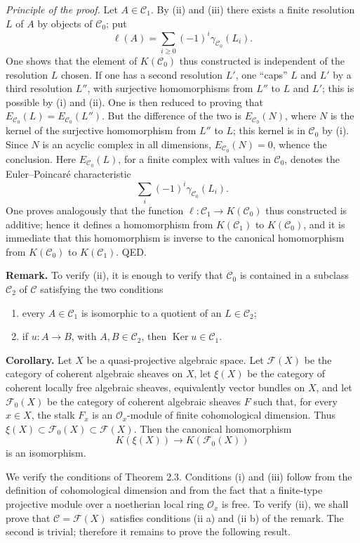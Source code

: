 \documentclass[11pt]{article}
\providecommand{\cC}{\mathcal C}
\providecommand{\cF}{\mathscr F}
\providecommand{\Ker}{\operatorname{Ker}}
\providecommand{\cO}{\mathcal O}
\begin{document}
\emph{Principle of the proof.} Let $A\in\cC_1$. By (ii) and (iii) there exists a finite resolution $L$ of $A$ by objects of $\cC_0$; put
\[
 \ell(A)=\sum_{i\geq 0}(-1)^i\gamma_{\cC_0}(L_i).
\]
One shows that the element of $K(\cC_0)$ thus constructed is independent of the resolution $L$ chosen. If one has a second resolution $L'$, one ``caps'' $L$ and $L'$ by a third resolution $L''$, with surjective homomorphisms from $L''$ to $L$ and $L'$; this is possible by (i) and (ii). One is then reduced to proving that $E_{\cC_0}(L)=E_{\cC_0}(L'')$. But the difference of the two is $E_{\cC_0}(N)$, where $N$ is the kernel of the surjective homomorphism from $L''$ to $L$; this kernel is in $\cC_0$ by (i). Since $N$ is an acyclic complex in all dimensions, $E_{\cC_0}(N)=0$, whence the conclusion. Here $E_{\cC_0}(L)$, for a finite complex with values in $\cC_0$, denotes the Euler--Poincar\'e characteristic
\[
 \sum_i (-1)^i\gamma_{\cC_0}(L_i).
\]
One proves analogously that the function $\ell:\cC_1\to K(\cC_0)$ thus constructed is additive; hence it defines a homomorphism from $K(\cC_1)$ to $K(\cC_0)$, and it is immediate that this homomorphism is inverse to the canonical homomorphism from $K(\cC_0)$ to $K(\cC_1)$. QED.

\textbf{Remark.} To verify (ii), it is enough to verify that $\cC_0$ is contained in a subclass $\cC_2$ of $\cC$ satisfying the two conditions
\begin{enumerate}[label=(ii \alph*)]
\item every $A\in\cC_1$ is isomorphic to a quotient of an $L\in\cC_2$;
\item if $u:A\to B$, with $A,B\in\cC_2$, then $\Ker u\in\cC_1$.
\end{enumerate}

\textbf{Corollary.} Let $X$ be a quasi-projective algebraic space. Let $\cF(X)$ be the category of coherent algebraic sheaves on $X$, let $\xi(X)$ be the category of coherent locally free algebraic sheaves, equivalently vector bundles on $X$, and let $\cF_0(X)$ be the category of coherent algebraic sheaves $F$ such that, for every $x\in X$, the stalk $F_x$ is an $\cO_x$-module of finite cohomological dimension. Thus $\xi(X)\subset\cF_0(X)\subset\cF(X)$. Then the canonical homomorphism
\begin{equation}\tag{2.12}
 K(\xi(X))\longrightarrow K(\cF_0(X))
\end{equation}
is an isomorphism.

We verify the conditions of Theorem 2.3. Conditions (i) and (iii) follow from the definition of cohomological dimension and from the fact that a finite-type projective module over a noetherian local ring $\cO_x$ is free. To verify (ii), we shall prove that $\cC=\cF(X)$ satisfies conditions (ii a) and (ii b) of the remark. The second is trivial; therefore it remains to prove the following result.
\end{document}
